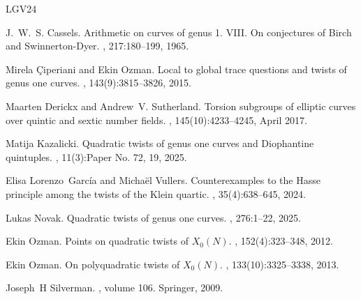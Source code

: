 \documentclass[a4paper, 12pt]{amsart}
\theoremstyle{definition}
\theoremstyle{remark}
\numberwithin{equation}{section}
\begin{document}
\begin{thebibliography}{LGV24}

J.~W.~S. Cassels.
\newblock Arithmetic on curves of genus 1. {VIII}. {O}n conjectures of {B}irch and {S}winnerton-{D}yer.
, 217:180--199, 1965.

Mirela \c{C}iperiani and Ekin Ozman.
\newblock Local to global trace questions and twists of genus one curves.
, 143(9):3815--3826, 2015.

Maarten Derickx and Andrew~V. Sutherland.
\newblock Torsion subgroups of elliptic curves over quintic and sextic number fields.
, 145(10):4233{--}4245, April 2017.

Matija Kazalicki.
\newblock Quadratic twists of genus one curves and {D}iophantine quintuples.
, 11(3):Paper No. 72, 19, 2025.

Elisa Lorenzo~Garc\'ia and Micha\"el Vullers.
\newblock Counterexamples to the {H}asse principle among the twists of the {K}lein quartic.
, 35(4):638--645, 2024.

Lukas Novak.
\newblock Quadratic twists of genus one curves.
, 276:1--22, 2025.

Ekin Ozman.
\newblock Points on quadratic twists of {$X_0(N)$}.
, 152(4):323--348, 2012.

Ekin Ozman.
\newblock On polyquadratic twists of {$X_0(N)$}.
, 133(10):3325--3338, 2013.

Joseph~H Silverman.
, volume 106.
\newblock Springer, 2009.

\end{thebibliography}
\end{document}
